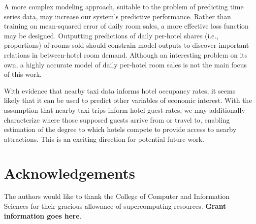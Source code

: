 \documentclass[useAMS, usenatbib]{biom}
\begin{document}
A more complex modeling approach, suitable to the problem of predicting time series data, may increase our system's predictive performance. Rather than training on mean-squared error of daily room sales, a more effective loss function may be designed. Outputting predictions of daily per-hotel shares (i.e., proportions) of rooms sold should constrain model outputs to discover important relations in between-hotel room demand. Although an interesting problem on its own, a highly accurate model of daily per-hotel room sales is not the main focus of this work.

With evidence that nearby taxi data informs hotel occupancy rates, it seems likely that it can be used to predict other variables of economic interest. With the assumption that nearby taxi trips inform hotel guest rates, we may additionally characterize where those supposed guests arrive from or travel to, enabling estimation of the degree to which hotels compete to provide access to nearby attractions. This is an exciting direction for potential future work.

\backmatter

\section*{Acknowledgements}

The authors would like to thank the College of Computer and Information Sciences for their gracious allowance of supercomputing resources. \textbf{Grant information goes here}.

 


\label{lastpage}
\end{document}
